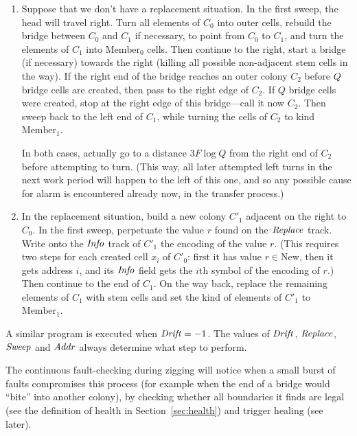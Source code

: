 \documentclass[11pt]{memoir}
\theoremstyle{definition} %
\newcommand{\fld}[1]{\ensuremath{\textit{#1\/}}}
\newcommand{\F}{F}
\newcommand{\Q}{Q} %
\newcommand{\Addr}{\fld{Addr}}
\newcommand{\Drift}{\fld{Drift}}
\newcommand{\Info}{\fld{Info}}
\newcommand{\Replace}{\fld{Replace}}
\newcommand{\Sweep}{\fld{Sweep}} %
\newcommand{\New}{\mathrm{New}}
\newcommand{\Member}{\mathrm{Member}}
\begin{document}
\begin{enumerate}
\item \label{i:target}
  Suppose that we don't have a replacement situation.
  In the first sweep, the head will travel right.
  Turn all elements of \( C_{0} \) into outer cells,
  rebuild the bridge between \( C_{0} \) and \( C_{1} \) if necessary, to point from \( C_{0} \) to \( C_{1} \),
  and turn the elements of \( C_{1} \) into \( \Member_{0} \) cells.
  Then continue to the right, start a bridge (if necessary) towards the right
  (killing all possible non-adjacent stem cells in the way).
  If the right end of the bridge reaches an outer colony \( C_{2} \)
  before \( Q \) bridge cells are created, then pass to the right edge of \( C_{2} \).
  If \( Q \) bridge cells were created, stop at the right edge of this bridge---call it now \( C_{2} \).
  Then sweep back to the left end of  \( C_{1} \), while turning the cells of \( C_{2} \) to 
  kind \( \Member_{1} \).

  In both cases, actually go to a distance \( 3\F\log \Q \) from the right end of \( C_{2} \)
  before attempting to turn.
  (This way, all later attempted left turns in the next work period
  will happen to the left of this one, and so any possible cause for alarm is encountered
  already now, in the transfer process.)

\item\label{i:replace}
  In the replacement situation, build a new colony \( C'_{1} \) adjacent on the right to \( C_{0} \).
  In the first sweep, perpetuate the value \( r \) found on the \( \Replace \) track.
  Write onto the  \( \Info \) track of \( C'_{1} \) the encoding of the value \( r \).
  (This requires two steps for each created cell \( x_{i} \) of \( C'_{0} \):
  first it has value \( r\in\New \), then it gets address \( i \), and its \( \Info \) field
  gets the \( i \)th symbol of the encoding of \( r \).)
  Then continue to the end of \( C_{1} \).
  On the way back, replace the remaining elements of \( C_{1} \) with stem cells
  and set the kind of elements of \( C'_{1} \) to \( \Member_{1} \).

\end{enumerate}

A similar program is executed when \( \Drift=-1 \).
The values of \( \Drift \), \( \Replace \), \( \Sweep \) and \( \Addr \) always determine what step
to perform.
  
  The continuous fault-checking during zigging will notice
when a small burst of faults compromises this process (for example when the end of a bridge would
``bite'' into another colony), by checking whether all boundaries it finds are legal (see the definition of
health in Section~\ref{sec:health}) and trigger healing (see later).
\end{document}
